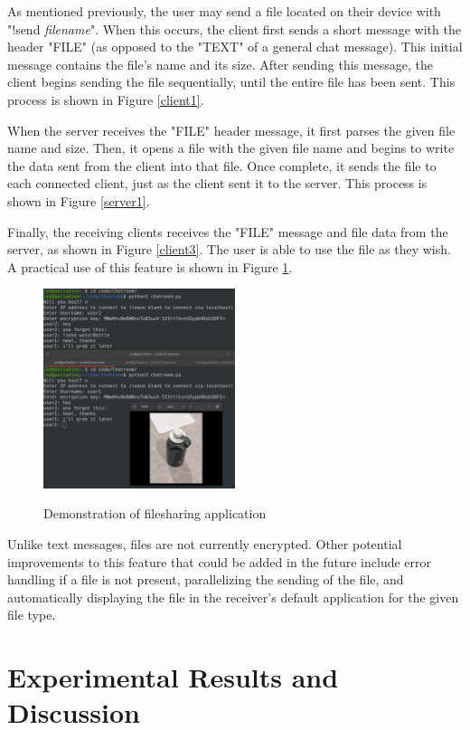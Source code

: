 \documentclass{article}
\begin{document}
As mentioned previously, the user may send a file located on their device with "!send \emph{filename}". When this occurs, the client first sends a short message with the header "FILE" (as opposed to the "TEXT" of a general chat message). This initial message contains the file's name and its size. After sending this message, the client begins sending the file sequentially, until the entire file has been sent. This process is shown in Figure \ref{client1}.

When the server receives the "FILE" header message, it first parses the given file name and size. Then, it opens a file with the given file name and begins to write the data sent from the client into that file. Once complete, it sends the file to each connected client, just as the client sent it to the server. This process is shown in Figure \ref{server1}.

Finally, the receiving clients receives the "FILE" message and file data from the server, as shown in Figure \ref{client3}. The user is able to use the file as they wish. A practical use of this feature is shown in Figure \ref{fileshareDemo}.

\begin{figure}[h]
\centering
\caption{Demonstration of filesharing application}
\includegraphics[width=0.5\textwidth]{media/fileshareDemo.png}
\label{fileshareDemo}
\end{figure}

Unlike text messages, files are not currently encrypted. Other potential improvements to this feature that could be added in the future include error handling if a file is not present, parallelizing the sending of the file, and automatically displaying the file in the receiver's default application for the given file type.

\section{Experimental Results and Discussion}
\end{document}
